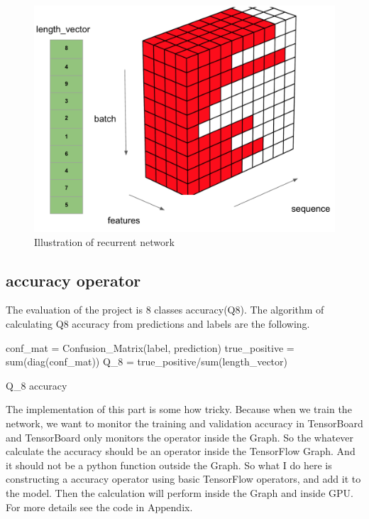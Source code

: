 \begin{figure}[H] 
	\centering
	\includegraphics[width=5in]{Figures/loss}
	\caption[Detail inside recurrent unit]{Illustration of recurrent network}
	\label{fig:loss}
\end{figure}

\subsection{accuracy operator}
The evaluation of the project is 8 classes accuracy(Q8). The algorithm of calculating Q8 accuracy from predictions and labels are the following.

\begin{algorithm}[H] 
    conf\_mat = Confusion\_Matrix(label, prediction)\;
    true\_positive = sum(diag(conf\_mat))\;
    Q\_8 = true\_positive/sum(length\_vector)\;
 \caption{Q\_8 accuracy }
\end{algorithm}

The implementation of this part is some how tricky. Because when we train the network, we want to monitor the training and validation accuracy in TensorBoard and TensorBoard only monitors the operator inside the Graph. So the whatever calculate the accuracy should be an operator inside the TensorFlow Graph. And it should not be a python function outside the Graph. So what I do here is constructing a accuracy operator using basic TensorFlow operators, and add it to the model. Then the calculation will perform inside the Graph and inside GPU. For more details see the code in Appendix.